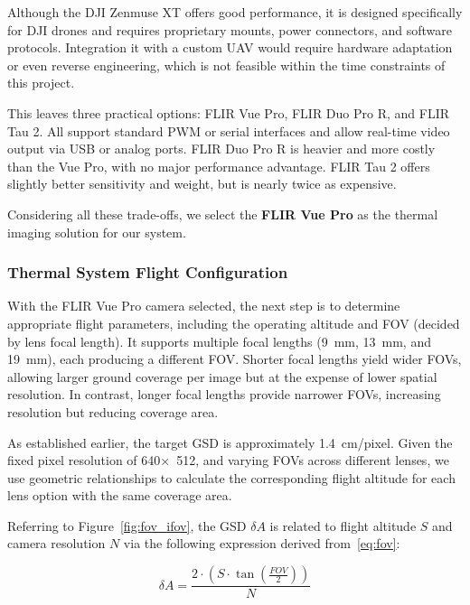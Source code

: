 Although the DJI Zenmuse XT offers good performance, it is designed specifically for DJI drones and requires proprietary mounts, power connectors, and software protocols. Integration it with a custom \gls{UAV} would require hardware adaptation or even reverse engineering, which is not feasible within the time constraints of this project.

This leaves three practical options: FLIR Vue Pro, FLIR Duo Pro R, and FLIR Tau 2. All support standard PWM or serial interfaces and allow real-time video output via USB or analog ports. FLIR Duo Pro R is heavier and more costly than the Vue Pro, with no major performance advantage. FLIR Tau 2 offers slightly better sensitivity and weight, but is nearly twice as expensive.

Considering all these trade-offs, we select the \textbf{FLIR Vue Pro} as the thermal imaging solution for our system.



\subsubsection{Thermal System Flight Configuration}\label{thermal_flight}

With the FLIR Vue Pro camera selected, the next step is to determine appropriate flight parameters, including the operating altitude and \gls{FOV} (decided by lens focal length). It supports multiple focal lengths (9~mm, 13~mm, and 19~mm), each producing a different \gls{FOV}. Shorter focal lengths yield wider \gls{FOV}s, allowing larger ground coverage per image but at the expense of lower spatial resolution. In contrast, longer focal lengths provide narrower \gls{FOV}s, increasing resolution but reducing coverage area.

As established earlier, the target \gls{GSD} is approximately 1.4~cm/pixel. Given the fixed pixel resolution of 640×~512, and varying \gls{FOV}s across different lenses, we use geometric relationships to calculate the corresponding flight altitude for each lens option with the same coverage area.

Referring to Figure~\ref{fig:fov_ifov}, the \gls{GSD} \( \delta A \) is related to flight altitude \( S \) and camera resolution \( N \) via the following expression derived from~\ref{eq:fov}:

\begin{equation}
\delta A = \frac{2 \cdot (S \cdot \tan(\frac{FOV}{2}))}{N}
\end{equation}

